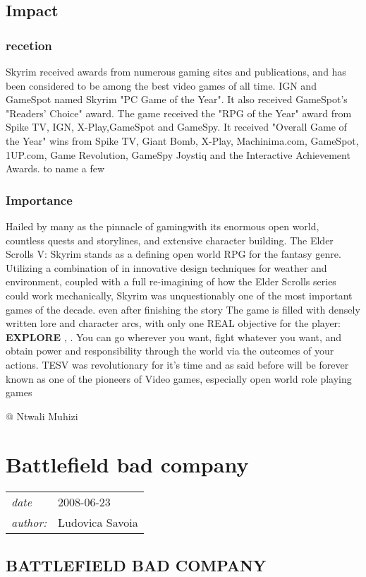 \documentclass[a4paper,10pt]{book}
\newcommand{\pageHeader}[4]{
    \section{#1}
    \vspace{-0.3cm}
    \begin{table}[h!]
     \begin{tabular}{ll}
        \hline
        \textit{date} & #2 \\
        \textit{author: } & #3\\
        \hline
     \end{tabular}
    \end{table}
    \vspace{-0.3cm}
}
\begin{document}
 
 \subsection{Impact }
 \subsubsection{recetion }
 
          Skyrim received awards from numerous gaming sites and publications, and has been considered to be among the best video games of all time. IGN and GameSpot named Skyrim "PC Game of the Year".
           It also received GameSpot's "Readers' Choice" award. The game received the "RPG of the Year" award from Spike TV, IGN, X-Play,GameSpot and GameSpy. It received "Overall Game of the Year" wins from Spike TV, Giant Bomb, X-Play,
           Machinima.com, GameSpot, 1UP.com, Game Revolution, GameSpy Joystiq and the Interactive Achievement Awards. to name a few
         
 
 \subsubsection{Importance }
 
          Hailed by many as the pinnacle of gamingwith its enormous open world, countless quests and storylines, and extensive character building.
          The Elder Scrolls V: Skyrim stands as a defining open world RPG for the fantasy genre. Utilizing a combination of in innovative design techniques for weather and environment, coupled with a full re-imagining of how the Elder Scrolls series could work mechanically,
          Skyrim was unquestionably one of the most important games of the decade. even after finishing the story The game is filled with densely written lore and character arcs, with only one REAL objective for the player:  \textbf{EXPLORE } ,
          . You can go wherever you want, fight whatever you want, and obtain power and responsibility through the world via the outcomes of your actions. TESV was revolutionary for it's time and as said before
          will be forever known as one of the pioneers of Video games, especially open world role playing games

         
 
 @ Ntwali Muhizi 
 
 \newpage\pageHeader{Battlefield bad company}{2008-06-23}{Ludovica Savoia}{One of the best shooting games}
 \subsection{BATTLEFIELD BAD COMPANY }
\end{document}
